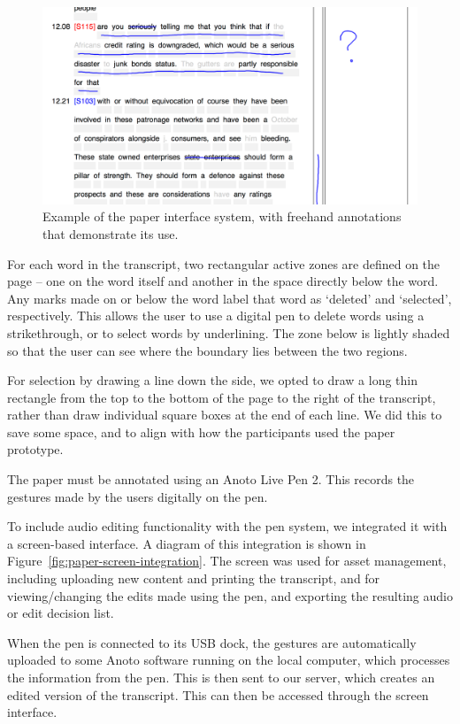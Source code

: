 \begin{figure}[p]
  \centering
  \includegraphics[width=\columnwidth]{figs/paper-interface-example-annotations.png}
  \caption{Example of the paper interface system, with freehand annotations that demonstrate its use.}
  \label{fig:paper-interface-example}
\end{figure}

For each word in the transcript, two rectangular active zones are defined on the page -- one on the word itself and
another in the space directly below the word.  Any marks made on or below the word label that word as `deleted' and
`selected', respectively.  This allows the user to use a digital pen to delete words using a strikethrough, or to
select words by underlining.  The zone below is lightly shaded so that the user can see where the boundary lies between
the two regions.

For selection by drawing a line down the side, we opted to draw a long thin rectangle from the top to the bottom of the
page to the right of the transcript, rather than draw individual square boxes at the end of each line. We did this to
save some space, and to align with how the participants used the paper prototype.

The paper must be annotated using an Anoto Live Pen 2. This records the gestures made by the users digitally on the
pen.

To include audio editing functionality with the pen system, we integrated it with a screen-based interface. A diagram
of this integration is shown in Figure~\ref{fig:paper-screen-integration}. The screen
was used for asset management, including uploading new content and printing the transcript, and for viewing/changing
the edits made using the pen, and exporting the resulting audio or edit decision list.

When the pen is connected to its USB dock, the gestures are automatically uploaded to some Anoto software running
on the local computer, which processes the information from the pen. This is then sent to our server, which creates an
edited version of the transcript. This can then be accessed through the screen interface.

